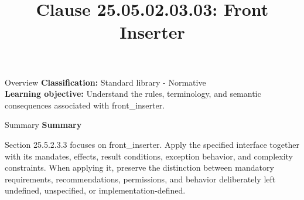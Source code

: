 \documentclass[10pt,letterpaper]{article}
\title{Clause 25.05.02.03.03: Front Inserter}
\author{}
\date{}
\begin{document}
\maketitle
\begin{CornellOverviewBox}{Overview}
\textbf{Classification:} Standard library - Normative\\[2pt]
\textbf{Learning objective:} Understand the rules, terminology, and semantic consequences associated with front\_inserter.
\end{CornellOverviewBox}\begin{CornellSummaryBox}{Summary}
{\sffamily\bfseries\color{Accent} Summary}\par\vspace{3pt}Section 25.5.2.3.3 focuses on front\_inserter. Apply the specified interface together with its mandates, effects, result conditions, exception behavior, and complexity constraints. When applying it, preserve the distinction between mandatory requirements, recommendations, permissions, and behavior deliberately left undefined, unspecified, or implementation-defined.
\end{CornellSummaryBox}
\end{document}
